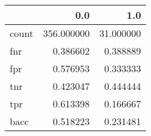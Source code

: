 \begin{tabular}{lrr}
\toprule
{} &         0.0 &        1.0 \\
\midrule
count &  356.000000 &  31.000000 \\
fnr   &    0.386602 &   0.388889 \\
fpr   &    0.576953 &   0.333333 \\
tnr   &    0.423047 &   0.444444 \\
tpr   &    0.613398 &   0.166667 \\
bacc  &    0.518223 &   0.231481 \\
\bottomrule
\end{tabular}
